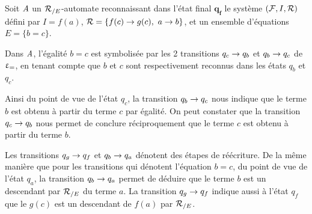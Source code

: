\begin{example}
  \label{ex:semantics}
  Soit $\mathit A$ un ${\mathcal R_{/E}}$-automate reconnaissant dans l'état final $\mathbf{q_f}$
  le système $(\mathcal{F}, I, \mathcal R)$ défini par $I = f(a)$, $\mathcal R = \{f(c) \rightarrow g(c),\ a \rightarrow b\}$, et un ensemble d'équations $E = \{ b = c\}$.

  Dans $\mathit A$, l'égalité $b = c$ est symbolisée par les 2 transitions $q_c
  \rightarrow q_b$ et $q_b \rightarrow q_c$ de $\upvarepsilon_{=}$, en tenant compte que $b$ et $c$
  sont respectivement reconnus dans les états $q_b$ et $q_c$.
  
  Ainsi du point de vue de l'état $q_c$, la transition $q_b \rightarrow q_c$
  nous indique que le terme $b$ est obtenu à partir du terme $c$ par égalité.
  On peut constater que la transition $q_c \rightarrow q_b$ nous permet 
  de conclure réciproquement que le terme $c$ est obtenu à partir du terme $b$.

  Les transitions $q_g \rightarrow q_f$ et $q_b \rightarrow q_a$ dénotent des étapes de réécriture.
  De la même manière que pour les transitions qui dénotent l'équation $b=c$, du point
  de vue de l'état $q_a$, la transition $q_b \rightarrow q_a$ permet de déduire que le terme
  $b$ est un descendant par ${\mathcal R_{/E}}$ du terme $a$. La transition $q_g \rightarrow q_f$ indique 
  aussi à l'état $q_f$ que le $g(c)$ est un descendant de $f(a)$ par ${\mathcal R_{/E}}$.


\end{example}

